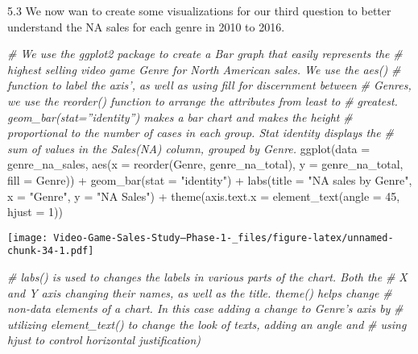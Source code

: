 \documentclass[
]{article}
\newenvironment{Shaded}{\begin{snugshade}}{\end{snugshade}}
\newcommand{\AttributeTok}[1]{\textcolor[rgb]{0.77,0.63,0.00}{#1}}
\newcommand{\CommentTok}[1]{\textcolor[rgb]{0.56,0.35,0.01}{\textit{#1}}}
\newcommand{\DecValTok}[1]{\textcolor[rgb]{0.00,0.00,0.81}{#1}}
\newcommand{\FunctionTok}[1]{\textcolor[rgb]{0.00,0.00,0.00}{#1}}
\newcommand{\NormalTok}[1]{#1}
\newcommand{\SpecialCharTok}[1]{\textcolor[rgb]{0.00,0.00,0.00}{#1}}
\newcommand{\StringTok}[1]{\textcolor[rgb]{0.31,0.60,0.02}{#1}}
\begin{document}
5.3 We now wan to create some visualizations for our third question to
better understand the NA sales for each genre in 2010 to 2016.

\begin{Shaded}
\begin{Highlighting}[]
\CommentTok{\# We use the ggplot2 package to create a Bar graph that easily represents the}
\CommentTok{\# highest selling video game Genre for North American sales. We use the aes()}
\CommentTok{\# function to label the axis’, as well as using fill for discernment between}
\CommentTok{\# Genres, we use the reorder() function to arrange the attributes from least to}
\CommentTok{\# greatest. geom\_bar(stat=”identity”) makes a bar chart and makes the height}
\CommentTok{\# proportional to the number of cases in each group. Stat identity displays the}
\CommentTok{\# sum of values in the Sales(NA) column, grouped by Genre.}
\FunctionTok{ggplot}\NormalTok{(}\AttributeTok{data =}\NormalTok{ genre\_na\_sales, }\FunctionTok{aes}\NormalTok{(}\AttributeTok{x =} \FunctionTok{reorder}\NormalTok{(Genre, genre\_na\_total), }\AttributeTok{y =}\NormalTok{ genre\_na\_total,}
    \AttributeTok{fill =}\NormalTok{ Genre)) }\SpecialCharTok{+} \FunctionTok{geom\_bar}\NormalTok{(}\AttributeTok{stat =} \StringTok{"identity"}\NormalTok{) }\SpecialCharTok{+} \FunctionTok{labs}\NormalTok{(}\AttributeTok{title =} \StringTok{"NA sales by Genre"}\NormalTok{,}
    \AttributeTok{x =} \StringTok{"Genre"}\NormalTok{, }\AttributeTok{y =} \StringTok{"NA Sales"}\NormalTok{) }\SpecialCharTok{+} \FunctionTok{theme}\NormalTok{(}\AttributeTok{axis.text.x =} \FunctionTok{element\_text}\NormalTok{(}\AttributeTok{angle =} \DecValTok{45}\NormalTok{, }\AttributeTok{hjust =} \DecValTok{1}\NormalTok{))}
\end{Highlighting}
\end{Shaded}

\texttt{[image: Video-Game-Sales-Study--Phase-1-\_files/figure-latex/unnamed-chunk-34-1.pdf]}

\begin{Shaded}
\begin{Highlighting}[]
\CommentTok{\# labs() is used to changes the labels in various parts of the chart. Both the}
\CommentTok{\# X and Y axis changing their names, as well as the title. theme() helps change}
\CommentTok{\# non{-}data elements of a chart. In this case adding a change to Genre’s axis by}
\CommentTok{\# utilizing element\_text() to change the look of texts, adding an angle and}
\CommentTok{\# using hjust to control horizontal justification)}
\end{Highlighting}
\end{Shaded}
\end{document}
